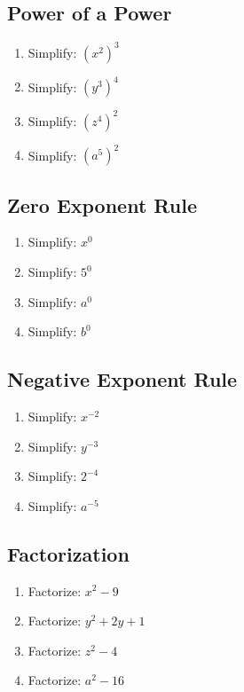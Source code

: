 \documentclass[12pt]{article}
\begin{document}
\subsection*{Power of a Power}
\begin{enumerate}
    \item Simplify: \((x^2)^3\)
    \item Simplify: \((y^3)^4\)
    \item Simplify: \((z^4)^2\)
    \item Simplify: \((a^5)^2\)
\end{enumerate}

\subsection*{Zero Exponent Rule}
\begin{enumerate}
    \item Simplify: \(x^0\)
    \item Simplify: \(5^0\)
    \item Simplify: \(a^0\)
    \item Simplify: \(b^0\)
\end{enumerate}

\subsection*{Negative Exponent Rule}
\begin{enumerate}
    \item Simplify: \(x^{-2}\)
    \item Simplify: \(y^{-3}\)
    \item Simplify: \(2^{-4}\)
    \item Simplify: \(a^{-5}\)
\end{enumerate}

\subsection*{Factorization}
\begin{enumerate}
    \item Factorize: \(x^2 - 9\)
    \item Factorize: \(y^2 + 2y + 1\)
    \item Factorize: \(z^2 - 4\)
    \item Factorize: \(a^2 - 16\)
\end{enumerate}
\end{document}
